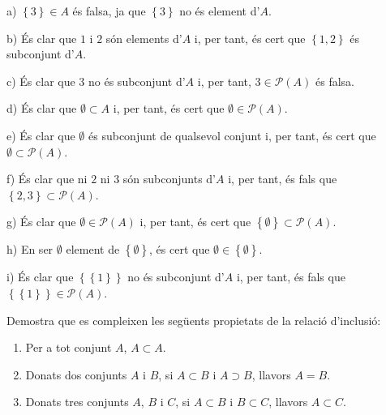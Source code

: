 \begin{solucio}
a) $\left\{ 3\right\} \in A$ és falsa, ja que $\left\{ 3\right\} $ no
és element d'$A$.

b) És clar que $1$ i $2$ són elements d'$A$ i, per tant, és cert
que $\left\{ 1,2\right\} $ és subconjunt d'$A$.

c) És clar que $3$ no és subconjunt d'$A$ i, per tant, $3\in
\mathcal{P}(A)$ és falsa.

d) És clar que $\emptyset \subset A$ i, per tant, és cert que $%
\emptyset \in \mathcal{P}(A)$.

e) És clar que $\emptyset $ és subconjunt de qualsevol conjunt i,
per tant, és cert que $\emptyset \subset \mathcal{P}(A)$.

f) És clar que ni $2$ ni $3$ són subconjunts d'$A$ i, per tant, és fals que $\left\{ 2,3\right\} \subset \mathcal{P}(A)$.

g) És clar que $\emptyset \in \mathcal{P}(A)$ i, per tant, és cert
que $\left\{ \emptyset \right\} \subset \mathcal{P}(A)$.

h) En ser $\emptyset $ element de $\left\{ \emptyset \right\} $, és cert
que $\emptyset \in \left\{ \emptyset \right\} $.

i) És clar que $\left\{ \left\{ 1\right\} \right\} $ no és
subconjunt d'$A$ i, per tant, és fals que $\left\{ \left\{ 1\right\}
\right\} \in \mathcal{P}(A)$.
\end{solucio}

\begin{exercici}
Demostra que es compleixen les següents propietats de la relació
d'inclusió:

\begin{enumerate}
\item Per a tot conjunt $A$, $A\subset A$.

\item Donats dos conjunts $A$ i $B$, si $A\subset B$ i $A\supset B$, llavors
$A=B$.

\item Donats tres conjunts $A$, $B$ i $C$, si $A\subset B$ i $B\subset C$,
llavors $A\subset C$.
\end{enumerate}
\end{exercici}

